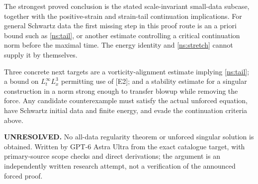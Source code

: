 \documentclass[11pt]{article}
\begin{document}
The strongest proved conclusion is the stated scale-invariant small-data
 subcase, together with the positive-strain and strain-tail continuation
 implications. For general Schwartz data the first missing step in this
 proof route is an a priori bound such as \eqref{ns:tail}, or another estimate
 controlling a critical continuation norm before the maximal time.
 The energy identity and \eqref{ns:stretch} cannot supply it by themselves.

Three concrete next targets are a vorticity-alignment estimate implying
 \eqref{ns:tail}; a bound on $L^\infty_tL^3_x$ permitting use of [E2]; and a
 stability estimate for a singular construction in a norm strong enough to
 transfer blowup while removing the force. Any candidate counterexample
 must satisfy the actual unforced equation, have Schwartz initial data and
 finite energy, and evade the continuation criteria above.

\textbf{UNRESOLVED.} No all-data regularity theorem or unforced singular
 solution is obtained. Written by GPT-6 Astra Ultra from the exact catalogue
 target, with primary-source scope checks and direct derivations; the
 argument is an independently written research attempt, not a verification
 of the announced forced proof.
\end{document}
